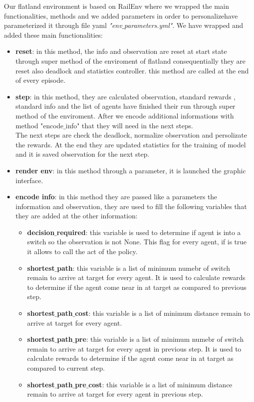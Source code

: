 Our flatland environment is based on RailEnv where we wrapped the main functionalities, methods and we added parameters in order to personalizehave parameterized it through file yaml \textit{"env$\_$parameters.yml"}. 
We have wrapped and added these main functionalities:
\begin{itemize}
\item \textbf{reset}: in this method, the info and observation are reset at start state through super method of the enviroment of flatland consequentially they are reset also deadlock and statistics controller. this method are called at the end of every episode.
\item \textbf{step}: in this method, they are calculated observation, standard rewards , standard info and the list of agents have finished their run through super method of the enviroment. After we encode additional informations with method "encode$\_$info" that they will need in the next steps. \\
The next steps are check the deadlock, normalize observation and persolizate the rewards. At the end they are updated statistics for the training of model and it is saved observation for the next step.
\item \textbf{render env}: in this method through a parameter, it is launched the graphic interface.
\item \textbf{encode info}: in this method they are passed like a parameters the information and observation, they are used to fill the following variables that they are added at the other information:
\begin{itemize}
\item \textbf{decision$\_$required}: this variable is used to determine if agent is into a switch so the observation is not None. This flag for every agent, if is true it allows to call the act of the policy.
\item \textbf{shortest$\_$path}: this variable is a list of minimum numebr of switch remain to arrive at target for every agent. It is used to calculate rewards to determine if the agent come near in at target as compared to previous step.
\item \textbf{shortest$\_$path$\_$cost}: this variable is a list of minimum distance remain to arrive at target for every agent. 
\item \textbf{shortest$\_$path$\_$pre}: this variable is a list of minimum numebr of switch remain to arrive at target for every agent in previous step. It is used to calculate rewards to determine if the agent come near in at target as compared to current step.
\item \textbf{shortest$\_$path$\_$pre$\_$cost}: this variable is a list of minimum distance remain to arrive at target for every agent in previous step.
\end{itemize}
\end{itemize}	
